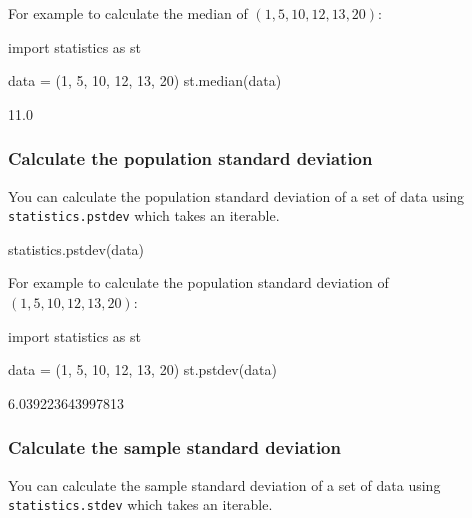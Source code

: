 For example to calculate the median of \((1, 5, 10, 12, 13, 20)\):




\begin{pyin}
import statistics as st

data = (1, 5, 10, 12, 13, 20)
st.median(data)
\end{pyin}





\begin{raw}
11.0
\end{raw}





\subsubsection{Calculate the population standard deviation}
\label{\detokenize{tools-for-mathematics/08-statistics/how/main:calculate-the-population-standard-deviation}}

You can calculate the population standard deviation of a set of data using \texttt{statistics.pstdev} which takes an
iterable.


\begin{pyin}
statistics.pstdev(data)
\end{pyin}



For example to calculate the population standard deviation of \((1, 5, 10, 12, 13, 20)\):




\begin{pyin}
import statistics as st

data = (1, 5, 10, 12, 13, 20)
st.pstdev(data)
\end{pyin}





\begin{raw}
6.039223643997813
\end{raw}





\subsubsection{Calculate the sample standard deviation}
\label{\detokenize{tools-for-mathematics/08-statistics/how/main:calculate-the-sample-standard-deviation}}

You can calculate the sample standard deviation of a set of data using \texttt{statistics.stdev} which takes an
iterable.


